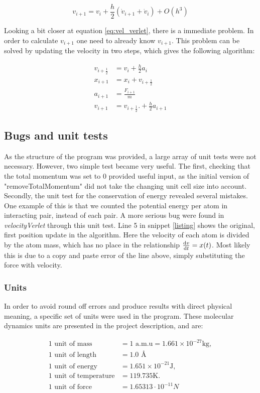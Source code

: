 \begin{equation}
v_{i+1} = v_i +  \frac{h}{2} \left(\dot{v}_{i+1}+\dot{v}_i\right)+ O(h^3) \label{eq:vel_verlet}
\end{equation}

Looking a bit closer at equation \ref{eq:vel_verlet}, there is a immediate problem. In order to calculate $ v_{i+1} $ one need to already know $ v_{i+1} $. This problem can be solved by updating the velocity in two steps, which gives the following algorithm:

\begin{align}
v_{i+\frac{1}{2}} &= v_i + \frac{h}{2} a_i\\
x_{i+1} &= x_i + v_{i+\frac{1}{2}}\\
a_{i+1} &= \frac{F_{i+1}}{m}\\
v_{i+1} &=v_{i+\frac{1}{2}}. + \frac{h}{2} a_{i+1}
\end{align} 


\subsection{Bugs and unit tests}

As the structure  of the program was provided, a large array of unit tests were not necessary. However, two simple test became very useful. The first, checking that the total momentum was set to 0 provided useful input, as the initial version of "removeTotalMomentum" did not take the changing unit cell size into account. Secondly, the unit test for the conservation of energy revealed several mistakes. One example of this is that we counted the potential energy per atom in interacting pair, instead of each pair. A more serious bug were found in \textit{velocityVerlet} through this unit test. Line 5 in snippet \ref{listing} shows the original, first position update in the algorithm. Here the velocity of each atom is divided by the atom mass, which has no place in the relationship $ \dv{v}{t} = x(t) $. Most likely this is due to a copy and paste error of the line above, simply substituting the force with velocity. 

\subsubsection{Units} \label{sec:units}

In order to avoid round off errors and produce results with direct physical meaning, a specific set of units were used in the program. These molecular dynamics units are presented in the project description, and are:

\begin{align}
\text{1 unit of mass } &= 1 \text{ a.m.u} = 1.661\times 10^{-27}\mathrm{kg},\\
\text{1 unit of length } &= 1.0 \text{ \AA} \\
\text{1 unit of energy } &= 1.651\times 10^{-21}\mathrm{J},\\
\text{1 unit of temperature} &= 119.735\mathrm{K}.\\
\text{1 unit of force}  &= 1.65313\cdot10^{-11} N 
\end{align}





